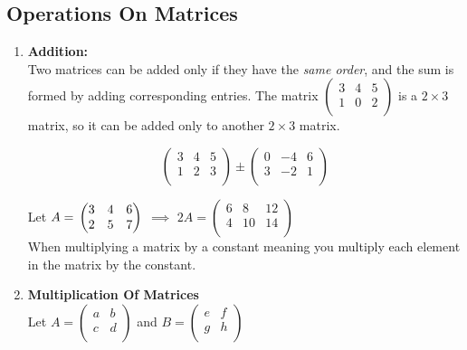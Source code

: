 \documentclass[11pt,a4paper]{article}
\theoremstyle{definition}
\begin{document}
\subsection{Operations On Matrices}
\begin{enumerate}
\item \textbf{Addition:}\\
Two matrices can be added only if they have the \emph{same order}, and the sum is
formed by adding corresponding entries. The matrix
$
\begin{pmatrix}
3 & 4 & 5\\
1 & 0 & 2\\
\end{pmatrix}
$ is a $2\times 3$ matrix, so it can be added only to another $2\times 3$ matrix.

$$
\begin{pmatrix}
3 & 4 & 5\\
1 & 2 & 3\\
\end{pmatrix}
\pm
\begin{pmatrix}
0 & -4 & 6\\
3 & -2 & 1\\
\end{pmatrix}
$$

Let $A=\\
\begin{pmatrix}
3 & 4 & 6\\
2 & 5 & 7\\
\end{pmatrix}
$ $\implies$ $2A=
\begin{pmatrix}
6 & 8 & 12\\
4 & 10 & 14\\
\end{pmatrix}
$\\

When multiplying a matrix by a constant meaning you multiply each element in the matrix by the constant.\\


\item \textbf{Multiplication Of Matrices}\\
Let $A=
\begin{pmatrix}
a & b\\
c & d\\
\end{pmatrix}
$ and $B=
\begin{pmatrix}
e & f\\
g & h\\
\end{pmatrix}
$\\


\end{enumerate}
\end{document}
